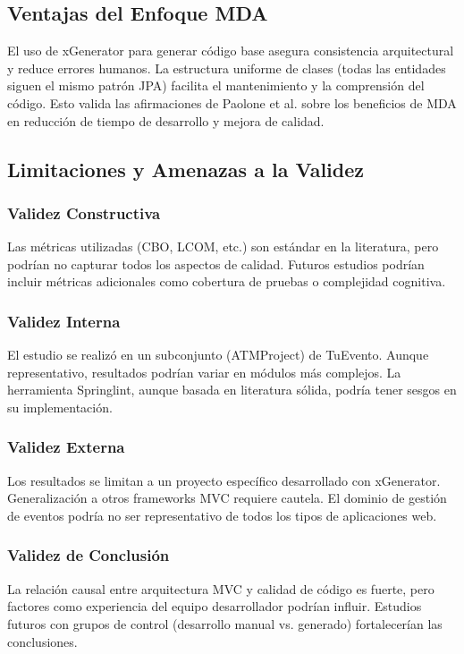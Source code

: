 \subsection{Ventajas del Enfoque MDA}
El uso de xGenerator para generar código base asegura consistencia arquitectural y reduce errores humanos. La estructura uniforme de clases (todas las entidades siguen el mismo patrón JPA) facilita el mantenimiento y la comprensión del código. Esto valida las afirmaciones de Paolone et al. \cite{paolone2020automatic} sobre los beneficios de MDA en reducción de tiempo de desarrollo y mejora de calidad.

\subsection{Limitaciones y Amenazas a la Validez}
\subsubsection{Validez Constructiva}
Las métricas utilizadas (CBO, LCOM, etc.) son estándar en la literatura, pero podrían no capturar todos los aspectos de calidad. Futuros estudios podrían incluir métricas adicionales como cobertura de pruebas o complejidad cognitiva.

\subsubsection{Validez Interna}
El estudio se realizó en un subconjunto (ATMProject) de TuEvento. Aunque representativo, resultados podrían variar en módulos más complejos. La herramienta Springlint, aunque basada en literatura sólida, podría tener sesgos en su implementación.

\subsubsection{Validez Externa}
Los resultados se limitan a un proyecto específico desarrollado con xGenerator. Generalización a otros frameworks MVC requiere cautela. El dominio de gestión de eventos podría no ser representativo de todos los tipos de aplicaciones web.

\subsubsection{Validez de Conclusión}
La relación causal entre arquitectura MVC y calidad de código es fuerte, pero factores como experiencia del equipo desarrollador podrían influir. Estudios futuros con grupos de control (desarrollo manual vs. generado) fortalecerían las conclusiones.

